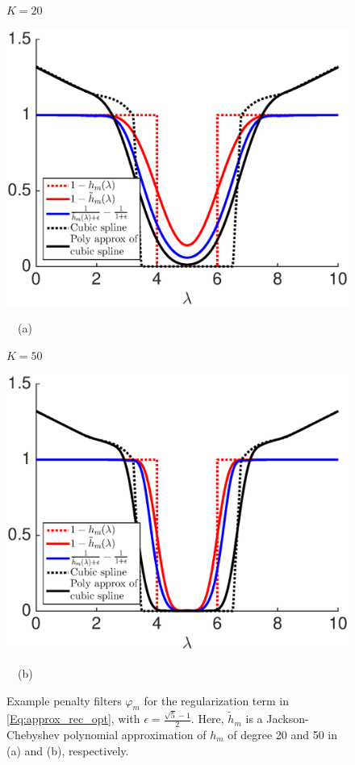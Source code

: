 \documentclass[journal, 10pt]{IEEEtran}
\begin{document}
\begin{figure}[tb]
\begin{minipage}[m]{0.49\linewidth}
\centerline{\small{$K=20$}}
\centerline{\includegraphics[width=1.1\linewidth]{fig_reg_filters_20}}
\centerline{~~\small{(a)}}
\end{minipage}
\begin{minipage}[m]{0.49\linewidth}
\centerline{\small{$K=50$}}
\centerline{\includegraphics[width=1.1\linewidth]{fig_reg_filters_50}}
\centerline{~~\small{(b)}}
\end{minipage} 
\caption{Example penalty filters $\varphi_m$ for the regularization term in \eqref{Eq:approx_rec_opt}, with $\epsilon=\frac{\sqrt{5}-1}{2}$. Here, $\tilde{h}_m$ is a Jackson-Chebyshev polynomial approximation of $h_m$ of degree 20 and 50 in (a) and (b), respectively. }\label{Fig:penalty}
\end{figure}
\end{document}

